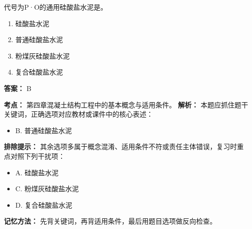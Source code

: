 \documentclass[UTF8,fontset=fandol,11pt]{ctexart}
\begin{document}
\vspace{0.2em}

\begin{quizbox}[title={第 36 题}]
代号为P·O的通用硅酸盐水泥是。\\
\begin{enumerate}[label=\Alph*.]
\item 硅酸盐水泥
\item 普通硅酸盐水泥
\item 粉煤灰硅酸盐水泥
\item 复合硅酸盐水泥
\end{enumerate}
\textbf{答案：} B
\vspace{0.25em}
\begin{answerbox}[title={考点解析}]
\textbf{考点：} 第四章混凝土结构工程中的基本概念与适用条件。
\textbf{解析：} 本题应抓住题干关键词，正确选项对应教材或课件中的核心表述：
\begin{itemize}
\item B. 普通硅酸盐水泥
\end{itemize}
\textbf{排除提示：} 其余选项多属于概念混淆、适用条件不符或责任主体错误，复习时重点对照下列干扰项：
\begin{itemize}
\item A. 硅酸盐水泥
\item C. 粉煤灰硅酸盐水泥
\item D. 复合硅酸盐水泥
\end{itemize}
\textbf{记忆方法：} 先背关键词，再背适用条件，最后用题目选项做反向检查。
\end{answerbox}
\end{quizbox}

\vspace{0.2em}
\end{document}
